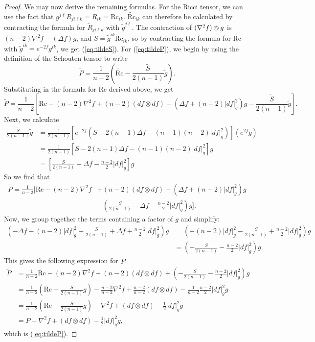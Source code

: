 \documentclass{amsart}
\numberwithin{equation}{section}
\newcommand{\Rc}{\mathrm{Rc}}
\theoremstyle{plain}
\theoremstyle{definition}
\theoremstyle{remark}
\begin{document}
\begin{proof}
We may now derive the remaining formulas. For the Ricci tensor, we can use the fact that $g^{j\ell}R_{ji\ell k} = R_{ik} = \Rc_{ik}$. $\widetilde{\Rc}_{ik}$ can therefore be calculated by contracting the formula for $\widetilde{R}_{ji\ell k}$ with $\tilde{g}^{j \ell}$. The contraction of $(\nabla^2 f) \owedge g$ is $(n-2)\nabla^2 f - (\Delta f)g$, and $\widetilde{S} = \tilde{g}^{ik}\widetilde{\Rc}_{ik}$, so by contracting the formula for $\widetilde{\Rc}$ with $\tilde{g}^{ik} = e^{-2f}g^{ik}$, we get (\ref{eq:tildeS}). For (\ref{eq:tildeP}), we begin by using the definition of the Schouten tensor to write
\[\widetilde{P} = \frac{1}{n-2} \left( \widetilde{\Rc} - \frac{\widetilde{S}}{2(n-1)} \tilde{g} \right).\]
Substituting in the formula for $\widetilde{\Rc}$ derived above, we get 
\[
\widetilde{P} = \frac{1}{n-2} \left[\Rc - (n-2)\nabla^2f + (n-2)(df \otimes df) - (\Delta f + (n-2)|df|_g^2)g - \frac{\widetilde{S}}{2(n-1)} \tilde{g} \right].
\]
Next, we calculate 
\begin{align*}
    \frac{\widetilde{S}}{2(n-1)} \tilde{g} &= \frac{1}{2(n-1)} \left[ e^{-2f} \left( S - 2(n-1)\Delta f -(n-1)(n-2)|df|_g^2 \right) \right] (e^{2f}g)\\
    &= \frac{1}{2(n-1)} \left[ S - 2(n-1)\Delta f -(n-1)(n-2)|df|_g^2 \right] g \\ 
    &= \left[ \frac{S}{2(n-1)} - \Delta f - \frac{n-2}{2}|df|_g^2 \right] g
\end{align*}
So we find that 
\begin{align*}
\widetilde{P} = \frac{1}{n-2} \bigg[\Rc - (n-2)\nabla^2f &+ (n-2)(df \otimes df) - (\Delta f + (n-2)|df|_g^2)g\\
 &- \left(\frac{S}{2(n-1)} - \Delta f - \frac{n-2}{2}|df|_g^2 \right) g\bigg].
\end{align*}
Now, we group together the terms containing a factor of $g$ and simplify:
\begin{align*}
\left(- \Delta f - (n-2)|df|_g^2 - \frac{S}{2(n-1)} + \Delta f + \frac{n-2}{2}|df|_g^2 \right)g &= \left(- (n-2)|df|_g^2 - \frac{S}{2(n-1)} + \frac{n-2}{2}|df|_g^2 \right)g\\
&= \left(-\frac{S}{2(n-1)} - \frac{n-2}{2}|df|_g^2 \right) g.
\end{align*} 
This gives the following expression for $\widetilde{P}$:
\begin{align*}
\widetilde{P} &= \frac{1}{n-2} \Rc - (n-2)\nabla^2f + (n-2)(df \otimes df) + \left(-\frac{S}{2(n-1)} - \frac{n-2}{2}|df|_g^2 \right) g\\
&= \frac{1}{n-2} \left( \Rc - \frac{S}{2(n-1)} g \right) - \frac{n-2}{n-2} \nabla^2f + \frac{n-2}{n-2} (df \otimes df) - \frac{1}{n-2} \frac{n-2}{2} |df|_g^2 g\\ 
&= \frac{1}{n-2} \left( \Rc - \frac{S}{2(n-1)} g \right) - \nabla^2 f + (df \otimes df) - \frac{1}{2}|df|_g^2 g \\
&= P - \nabla^2 f + (df \otimes df) - \frac{1}{2}|df|_g^2 g,
\end{align*}
which is (\ref{eq:tildeP}).


\end{proof}
\end{document}
